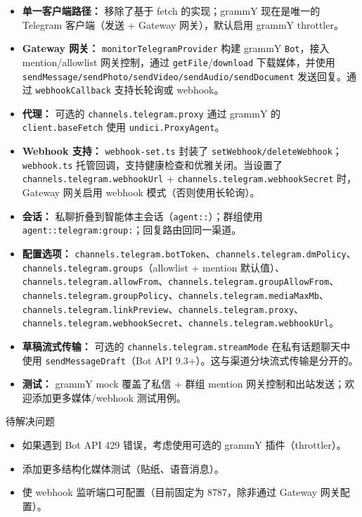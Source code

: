 \begin{itemize}
  \item \textbf{单一客户端路径：} 移除了基于 fetch 的实现；grammY 现在是唯一的 Telegram 客户端（发送 + Gateway 网关），默认启用 grammY throttler。
  \item \textbf{Gateway 网关：} \texttt{monitorTelegramProvider} 构建 grammY \texttt{Bot}，接入 mention/allowlist 网关控制，通过 \texttt{getFile}/\texttt{download} 下载媒体，并使用 \texttt{sendMessage/sendPhoto/sendVideo/sendAudio/sendDocument} 发送回复。通过 \texttt{webhookCallback} 支持长轮询或 webhook。
  \item \textbf{代理：} 可选的 \texttt{channels.telegram.proxy} 通过 grammY 的 \texttt{client.baseFetch} 使用 \texttt{undici.ProxyAgent}。
  \item \textbf{Webhook 支持：} \texttt{webhook-set.ts} 封装了 \texttt{setWebhook/deleteWebhook}；\texttt{webhook.ts} 托管回调，支持健康检查和优雅关闭。当设置了 \texttt{channels.telegram.webhookUrl} + \texttt{channels.telegram.webhookSecret} 时，Gateway 网关启用 webhook 模式（否则使用长轮询）。
  \item \textbf{会话：} 私聊折叠到智能体主会话（\texttt{agent::}）；群组使用 \texttt{agent::telegram:group:}；回复路由回同一渠道。
  \item \textbf{配置选项：} \texttt{channels.telegram.botToken}、\texttt{channels.telegram.dmPolicy}、\texttt{channels.telegram.groups}（allowlist + mention 默认值）、\texttt{channels.telegram.allowFrom}、\texttt{channels.telegram.groupAllowFrom}、\texttt{channels.telegram.groupPolicy}、\texttt{channels.telegram.mediaMaxMb}、\texttt{channels.telegram.linkPreview}、\texttt{channels.telegram.proxy}、\texttt{channels.telegram.webhookSecret}、\texttt{channels.telegram.webhookUrl}。
  \item \textbf{草稿流式传输：} 可选的 \texttt{channels.telegram.streamMode} 在私有话题聊天中使用 \texttt{sendMessageDraft}（Bot API 9.3+）。这与渠道分块流式传输是分开的。
  \item \textbf{测试：} grammY mock 覆盖了私信 + 群组 mention 网关控制和出站发送；欢迎添加更多媒体/webhook 测试用例。
\end{itemize}


待解决问题

\begin{itemize}
  \item 如果遇到 Bot API 429 错误，考虑使用可选的 grammY 插件（throttler）。
  \item 添加更多结构化媒体测试（贴纸、语音消息）。
  \item 使 webhook 监听端口可配置（目前固定为 8787，除非通过 Gateway 网关配置）。
\end{itemize}



